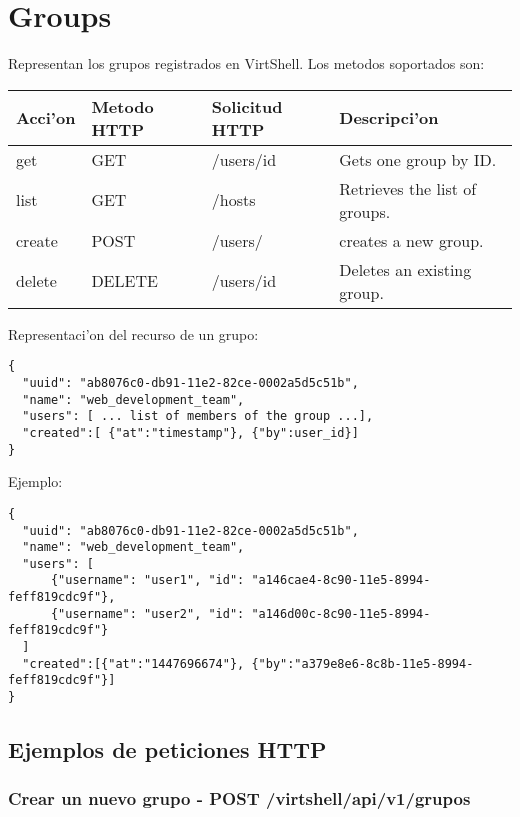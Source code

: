 \section{Groups}
Representan los grupos registrados en VirtShell. Los metodos soportados son:

\begin{center}
 \begin{tabular}{| l | l | l | l |}
 \hline
  \rowcolor{blueapi}
  \textbf{Acci'on} & \textbf{Metodo HTTP} & \textbf{Solicitud HTTP} & \textbf{Descripci'on} \\ [0.5ex] 
  \hline\hline
  get & GET & /users/id & Gets one group by ID. \\
  \hline
  list & GET & /hosts & Retrieves the list of groups. \\  
  \hline
  create & POST & /users/ & creates a new group. \\
  \hline
  delete & DELETE & /users/id & Deletes an existing group. \\
  \hline
\end{tabular}
\end{center}

\vspace{1cm}
Representaci'on del recurso de un grupo:
\vspace{1cm}

\begin{lstlisting}[style=json]
{
  "uuid": "ab8076c0-db91-11e2-82ce-0002a5d5c51b",
  "name": "web_development_team",
  "users": [ ... list of members of the group ...],  
  "created":[ {"at":"timestamp"}, {"by":user_id}]
}
\end{lstlisting}

Ejemplo:

\medskip
\begin{lstlisting}[style=json]
{
  "uuid": "ab8076c0-db91-11e2-82ce-0002a5d5c51b",
  "name": "web_development_team",
  "users": [ 
      {"username": "user1", "id": "a146cae4-8c90-11e5-8994-feff819cdc9f"},
      {"username": "user2", "id": "a146d00c-8c90-11e5-8994-feff819cdc9f"}
  ]
  "created":[{"at":"1447696674"}, {"by":"a379e8e6-8c8b-11e5-8994-feff819cdc9f"}]
}
\end{lstlisting}

\subsection{Ejemplos de peticiones HTTP}

\subsubsection{Crear un nuevo grupo - POST /virtshell/api/v1/grupos}


